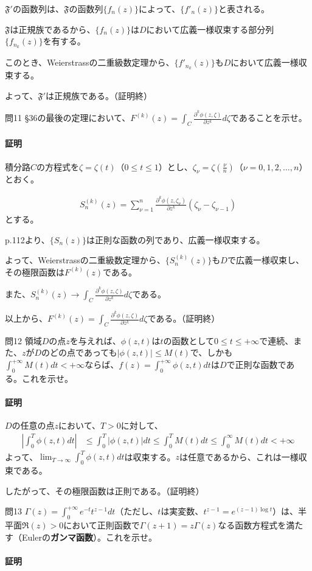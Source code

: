 $\mathfrak{F'}$の函数列は、$\mathfrak{F}$の函数列$\{f_n(z)\}$によって、$\{f'_n(z)\}$と表される。

$\mathfrak{F}$は正規族であるから、$\{f_n(z)\}$は$D$において広義一様収束する部分列$\{f_{n_k}(z)\}$を有する。

このとき、Weierstrassの二重級数定理から、$\{f'_{n_k}(z)\}$も$D$において広義一様収束する。

よって、$\mathfrak{F'}$は正規族である。（証明終）

\begin{mysimplebox}{問11}
    §36の最後の定理において、$F^{(k)}(z)=\int_{C}\frac{\partial^k\phi(z,\zeta)}{\partial z^k}d\zeta$であることを示せ。
\end{mysimplebox}
\paragraph{証明}
積分路$C$の方程式を$\zeta=\zeta(t)$（$0\le t\le1$）とし、$\zeta_\nu=\zeta(\frac{\nu}{n})$（$\nu=0,1,2,\dots,n$）とおく。

\begin{align*}
    S^{(k)}_n(z)=\sum_{\nu=1}^{n}\frac{\partial^k \phi(z,\zeta_\nu)}{\partial z^k}(\zeta_\nu-\zeta_{\nu-1})
\end{align*}
とする。

p.112より、$\{S_n(z)\}$は正則な函数の列であり、広義一様収束する。

よって、Weierstrassの二重級数定理から、$\{S^{(k)}_n(z)\}$も$D$で広義一様収束し、その極限函数は$F^{(k)}(z)$である。

また、$S^{(k)}_n(z)\longrightarrow\int_{C}\frac{\partial^k\phi(z,\zeta)}{\partial z^k}d\zeta$である。

以上から、$F^{(k)}(z)=\int_{C}\frac{\partial^k\phi(z,\zeta)}{\partial z^k}d\zeta$である。（証明終）

\begin{mysimplebox}{問12}
    領域$D$の点$z$を与えれば、$\phi(z,t)$は$t$の函数として$0\le t\le+\infty$で連続、また、$z$が$D$のどの点であっても$|\phi(z,t)|\le M(t)$で、しかも$\int_{0}^{+\infty}M(t)dt<+\infty$ならば、$f(z)=\int_{0}^{+\infty}\phi(z,t)dt$は$D$で正則な函数である。これを示せ。
\end{mysimplebox}
\paragraph{証明}
$D$の任意の点$z$において、$T>0$に対して、
\begin{align*}
    \left|\int_{0}^{T}\phi(z,t)dt\right|
    &\le\int_{0}^{T}|\phi(z,t)|dt
    \le\int_{0}^{T}M(t)dt
    \le\int_{0}^{\infty}M(t)dt<+\infty
\end{align*}
よって、$\lim_{T\to\infty}\int_{0}^{T}\phi(z,t)dt$は収束する。$z$は任意であるから、これは一様収束である。

したがって、その極限函数は正則である。（証明終）

\begin{mysimplebox}{問13}
    $\Gamma(z)=\int_{0}^{+\infty}e^{-t}t^{z-1}dt$（ただし、$t$は実変数、$t^{z-1}=e^{(z-1)\log t}$）は、半平面$\Re(z)>0$において正則函数で$\Gamma(z+1)=z\Gamma(z)$なる函数方程式を満たす（Eulerの\textbf{ガンマ函数}）。これを示せ。
\end{mysimplebox}
\paragraph{証明}